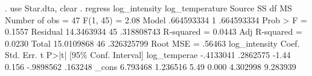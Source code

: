 . use Star.dta, clear
{\smallskip}
. regress log_intensity log_temperature
{\smallskip}
      Source {\VBAR}       SS           df       MS      Number of obs   =        47
   F(1, 45)        =      2.08
       Model {\VBAR}  .664593334         1  .664593334   Prob > F        =    0.1557
    Residual {\VBAR}  14.3463934        45  .318808743   R-squared       =    0.0443
   Adj R-squared   =    0.0230
       Total {\VBAR}  15.0109868        46  .326325799   Root MSE        =    .56463
{\smallskip}
log_intensity {\VBAR}      Coef.   Std. Err.      t    P>|t|     [95\% Conf. Interval]
log_tempera{\tytilde}e {\VBAR}  -.4133041   .2862575    -1.44   0.156    -.9898562     .163248
        _cons {\VBAR}   6.793468   1.236516     5.49   0.000     4.302998    9.283939
{\smallskip}
